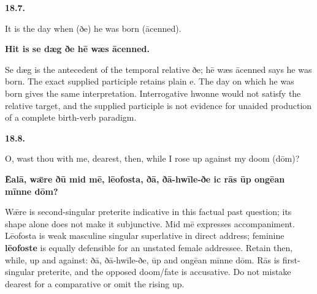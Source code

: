 \par\begin{minipage}{\linewidth}\raggedright
\textbf{18.7.}

It is the day when (ðe) he was born (ācenned).

\textbf{Hit is se dæg ðe hē wæs ācenned.}

Se dæg is the antecedent of the temporal relative ðe; hē wæs ācenned says he was born. The exact supplied participle retains plain e. The day on which he was born gives the same interpretation. Interrogative hwonne would not satisfy the relative target, and the supplied participle is not evidence for unaided production of a complete birth-verb paradigm.

\end{minipage}\par\addvspace{4pt}

\par\begin{minipage}{\linewidth}\raggedright
\textbf{18.8.}

O, wast thou with me, dearest, then, while I rose up against my doom (dōm)?

\textbf{Ēalā, wǣre ðū mid mē, lēofosta, ðā, ðā-hwīle-ðe ic rās ūp ongēan mīnne dōm?}

Wǣre is second-singular preterite indicative in this factual past question; its shape alone does not make it subjunctive. Mid mē expresses accompaniment. Lēofosta is weak masculine singular superlative in direct address; feminine \textbf{lēofoste} is equally defensible for an unstated female addressee. Retain then, while, up and against: ðā, ðā-hwīle-ðe, ūp and ongēan mīnne dōm. Rās is first-singular preterite, and the opposed doom/\allowbreak{}fate is accusative. Do not mistake dearest for a comparative or omit the rising up.

\end{minipage}\par\addvspace{4pt}

